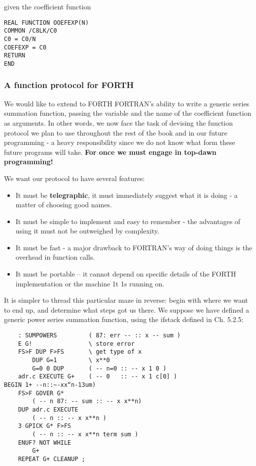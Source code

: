 given the coefficient function

\begin{lstlisting}
REAL FUNCTION OOEFEXP(N)
COMMON /C8LK/C0
C0 = C0/N
COEFEXP = C0
RETURN
END
\end{lstlisting}

\subsubsection{A function protocol for FORTH}

We would like to extend to FORTH FORTRAN’s ability to write a generic series summation function, passing the variable and the name of the coefficient function as arguments. In other words, we now face the task of devising the function protocol we plan to use throughout the rest of the book and in our future programming - a heavy responsibility since we do not know what form these future programs will take. \textbf{For once we must engage in top-dawn programming!}

We want our protocol to have several features:
\begin{itemize}
    \item It must be \textbf{telegraphic}, \ie it must immediately suggest what it is doing - a matter of choosing good names.
    \item It must be simple to implement and easy to remember - the advantages of using it must not be outweighed by complexity.
    \item It must be fast - a major drawback to FORTRAN's way of doing things is the overhead in function calls.
    \item It must be portable -- it cannot depend on specific details of the FORTH implementation or the machine 1t 1s running on.
\end{itemize}

It is simpler to thread this particular maze in reverse: begin with where we want to end up, and determine what steps got us there. We suppose we have defined a generic power series summation function, using the ifstack defined in Ch. 5.2.5:
\begin{lstlisting}
    : SUMPOWERS         ( 87: err -- :: x -- sum )
    E G!                \ store error
    FS>F DUP F>FS       \ get type of x
        DUP G=1         \ x**0
        G=0 0 DUP       ( -- n=0 :: -- x 1 0 )
    adr.c EXECUTE G+    ( -- 0   :: -- x 1 c[0] )
BEGIN 1+ --n::~-xx“n-13um)
    FS>F GOVER G*
        ( -- n 87: -- sum :: -- x x**n)
    DUP adr.c EXECUTE
        ( -- n :: -- x x**n )
    3 GPICK G* F>FS
        ( -- n :: -- x x**n term sum )
    ENUF? NOT WHILE
        G+
    REPEAT G+ CLEANUP ;
\end{lstlisting}

